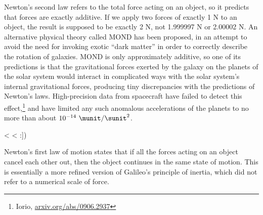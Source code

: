 \begin{listing}{1}
\begin{listing}{1}
\begin{listing}{1}
Newton's second law refers to the total force acting on an object, so it predicts that forces
are exactly additive. If we apply two forces of exactly
1 N to an object, the result is supposed to be
exactly 2 N, not 1.999997 N or 2.00002 N. An alternative physical theory called
MOND has been proposed, in an attempt to avoid the need for invoking exotic ``dark matter'' in order to correctly
describe the rotation of galaxies. MOND is only approximately additive, so one of its predictions is
that the gravitational forces exerted by the galaxy on the planets of the solar system would interact in
complicated ways with the solar system's internal gravitational forces, producing tiny discrepancies with
the predictions of Newton's laws. High-precision data from spacecraft have failed to detect this 
effect,\footnote{Iorio, \url{arxiv.org/abs/0906.2937}}
and have limited any such anomalous accelerations of the planets to no more than about $10^{-14}\ \munit/\sunit^2$.

<%
<%
:])

\begin{summary}

\begin{vocab}



\end{vocab}

\begin{notation}


\end{notation}

\begin{othernotation}


\end{othernotation}

\begin{summarytext}

Newton's first law of motion states that if all the forces
acting on an object cancel each other out, then the object
continues in the same state of motion. This is essentially a
more refined version of Galileo's principle of inertia,
which did not refer to a numerical scale of force.


\end{summarytext}
\end{summary}
\end{listing}
\end{listing}
\end{listing}
